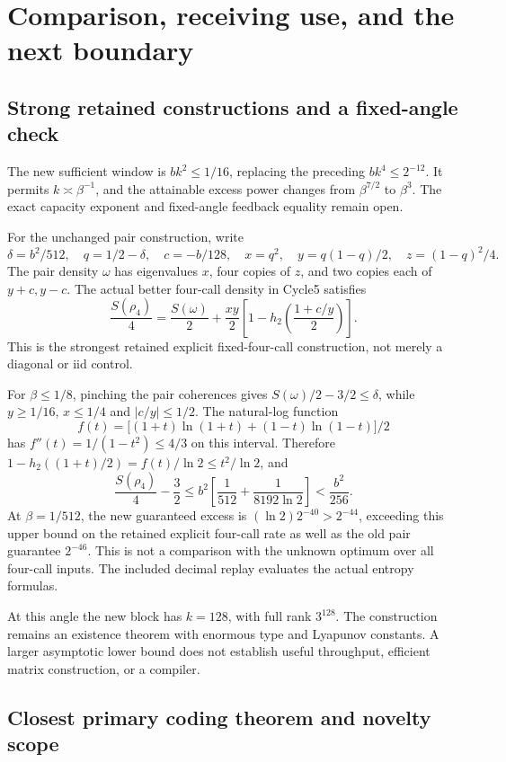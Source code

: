\documentclass[11pt]{article}
\begin{document}
\section{Comparison, receiving use, and the next boundary}

\subsection{Strong retained constructions and a fixed-angle check}

The new sufficient window is \(bk^2\le1/16\), replacing the preceding
\(bk^4\le2^{-12}\). It permits \(k\asymp\beta^{-1}\), and the attainable
excess power changes from \(\beta^{7/2}\) to \(\beta^3\).
The exact capacity exponent and fixed-angle feedback equality remain open.

For the unchanged pair construction, write
\[
 \delta=b^2/512,\quad q=1/2-\delta,\quad c=-b/128,\quad
 x=q^2,\quad y=q(1-q)/2,\quad z=(1-q)^2/4.
\]
The pair density \(\omega\) has eigenvalues \(x\), four copies of \(z\),
and two copies each of \(y+c,y-c\). The actual better four-call density
in Cycle5 satisfies
\[
 \frac{S(\rho_4)}4=\frac{S(\omega)}2+
 \frac{xy}{2}\left[1-h_2\left(\frac{1+c/y}{2}\right)\right].
\]
This is the strongest retained explicit fixed-four-call construction,
not merely a diagonal or iid control.

For \(\beta\le1/8\), pinching the pair coherences gives
\(S(\omega)/2-3/2\le\delta\), while \(y\ge1/16\), \(x\le1/4\) and
\(|c/y|\le1/2\). The natural-log function
\[
 f(t)=\big[(1+t)\ln(1+t)+(1-t)\ln(1-t)\big]/2
\]
has \(f''(t)=1/(1-t^2)\le4/3\) on this interval. Therefore
\(1-h_2((1+t)/2)=f(t)/\ln2\le t^2/\ln2\), and
\[
 \frac{S(\rho_4)}4-\frac32
 \le b^2\left[\frac1{512}+\frac1{8192\ln2}\right]
 <\frac{b^2}{256}.
\]
At \(\beta=1/512\), the new guaranteed excess is
\((\ln2)2^{-40}>2^{-44}\), exceeding this upper bound on the retained
explicit four-call rate as well as the old pair guarantee \(2^{-46}\).
This is not a comparison with the unknown optimum over all four-call inputs.
The included decimal replay evaluates the actual entropy formulas.

At this angle the new block has \(k=128\), with full rank \(3^{128}\).
The construction remains an existence theorem with enormous type and
Lyapunov constants. A larger asymptotic lower bound does not establish
useful throughput, efficient matrix construction, or a compiler.

\subsection{Closest primary coding theorem and novelty scope}
\end{document}

